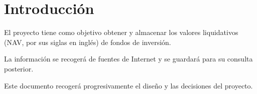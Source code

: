 \chapter{Introducción}

El proyecto tiene como objetivo obtener y almacenar los valores liquidativos
(NAV, por sus siglas en inglés) de fondos de inversión.

La información se recogerá de fuentes de Internet y se guardará para su consulta posterior.

Este documento recogerá progresivamente el diseño y las decisiones del
proyecto.
